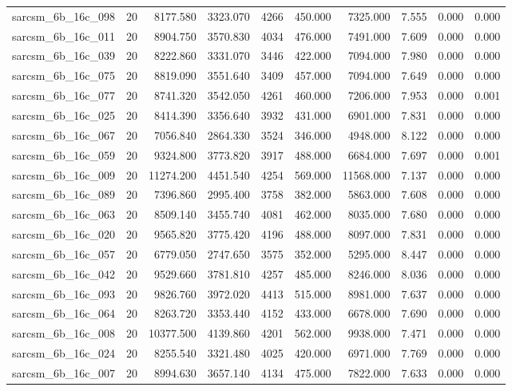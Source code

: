 \begin{tabular}{lrrrrrrrrr}
sarcsm\_6b\_16c\_098 & 20 & 8177.580 & 3323.070 & 4266 & 450.000 & 7325.000 & 7.555 & 0.000 & 0.000 \\
sarcsm\_6b\_16c\_011 & 20 & 8904.750 & 3570.830 & 4034 & 476.000 & 7491.000 & 7.609 & 0.000 & 0.000 \\
sarcsm\_6b\_16c\_039 & 20 & 8222.860 & 3331.070 & 3446 & 422.000 & 7094.000 & 7.980 & 0.000 & 0.000 \\
sarcsm\_6b\_16c\_075 & 20 & 8819.090 & 3551.640 & 3409 & 457.000 & 7094.000 & 7.649 & 0.000 & 0.000 \\
sarcsm\_6b\_16c\_077 & 20 & 8741.320 & 3542.050 & 4261 & 460.000 & 7206.000 & 7.953 & 0.000 & 0.001 \\
sarcsm\_6b\_16c\_025 & 20 & 8414.390 & 3356.640 & 3932 & 431.000 & 6901.000 & 7.831 & 0.000 & 0.000 \\
sarcsm\_6b\_16c\_067 & 20 & 7056.840 & 2864.330 & 3524 & 346.000 & 4948.000 & 8.122 & 0.000 & 0.000 \\
sarcsm\_6b\_16c\_059 & 20 & 9324.800 & 3773.820 & 3917 & 488.000 & 6684.000 & 7.697 & 0.000 & 0.001 \\
sarcsm\_6b\_16c\_009 & 20 & 11274.200 & 4451.540 & 4254 & 569.000 & 11568.000 & 7.137 & 0.000 & 0.000 \\
sarcsm\_6b\_16c\_089 & 20 & 7396.860 & 2995.400 & 3758 & 382.000 & 5863.000 & 7.608 & 0.000 & 0.000 \\
sarcsm\_6b\_16c\_063 & 20 & 8509.140 & 3455.740 & 4081 & 462.000 & 8035.000 & 7.680 & 0.000 & 0.000 \\
sarcsm\_6b\_16c\_020 & 20 & 9565.820 & 3775.420 & 4196 & 488.000 & 8097.000 & 7.831 & 0.000 & 0.000 \\
sarcsm\_6b\_16c\_057 & 20 & 6779.050 & 2747.650 & 3575 & 352.000 & 5295.000 & 8.447 & 0.000 & 0.000 \\
sarcsm\_6b\_16c\_042 & 20 & 9529.660 & 3781.810 & 4257 & 485.000 & 8246.000 & 8.036 & 0.000 & 0.000 \\
sarcsm\_6b\_16c\_093 & 20 & 9826.760 & 3972.020 & 4413 & 515.000 & 8981.000 & 7.637 & 0.000 & 0.000 \\
sarcsm\_6b\_16c\_064 & 20 & 8263.720 & 3353.440 & 4152 & 433.000 & 6678.000 & 7.690 & 0.000 & 0.000 \\
sarcsm\_6b\_16c\_008 & 20 & 10377.500 & 4139.860 & 4201 & 562.000 & 9938.000 & 7.471 & 0.000 & 0.000 \\
sarcsm\_6b\_16c\_024 & 20 & 8255.540 & 3321.480 & 4025 & 420.000 & 6971.000 & 7.769 & 0.000 & 0.000 \\
sarcsm\_6b\_16c\_007 & 20 & 8994.630 & 3657.140 & 4134 & 475.000 & 7822.000 & 7.633 & 0.000 & 0.000 \\

\end{tabular}
